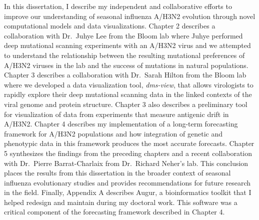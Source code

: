 In this dissertation, I describe my independent and collaborative efforts to improve our understanding of seasonal influenza A/H3N2 evolution through novel computational models and data visualizations.
Chapter 2 describes a collaboration with Dr.\ Juhye Lee from the Bloom lab where Juhye performed deep mutational scanning experiments with an A/H3N2 virus and we attempted to understand the relationship between the resulting mutational preferences of A/H3N2 viruses in the lab and the success of mutations in natural populations.
Chapter 3 describes a collaboration with Dr.\ Sarah Hilton from the Bloom lab where we developed a data visualization tool, \emph{dms-view}, that allows virologists to rapidly explore their deep mutational scanning data in the linked contexts of the viral genome and protein structure.
Chapter 3 also describes a preliminary tool for visualization of data from experiments that measure antigenic drift in A/H3N2.
Chapter 4 describes my implementation of a long-term forecasting framework for A/H3N2 populations and how integration of genetic and phenotypic data in this framework produces the most accurate forecasts.
Chapter 5 synthesizes the findings from the preceding chapters and a recent collaboration with Dr.\ Pierre Barrat-Charlaix from Dr.\ Richard Neher's lab.
This conclusion places the results from this dissertation in the broader context of seasonal influenza evolutionary studies and provides recommendations for future research in the field.
Finally, Appendix A describes Augur, a bioinformatics toolkit that I helped redesign and maintain during my doctoral work.
This software was a critical component of the forecasting framework described in Chapter 4.
